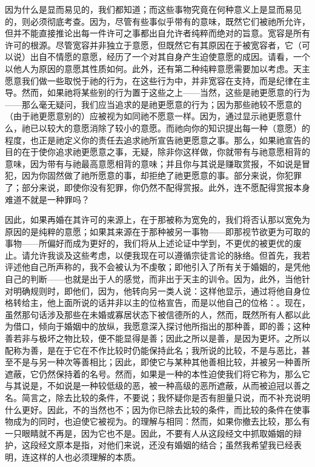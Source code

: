 因为什么是显而易见的，我们都知道；而这些事物究竟在何种意义上是显而易见的，则必须彻底考查。因为，尽管有些事似乎带有的意味，既然它们被祂所允许，但并不能直接推论出每一件许可之事都出自允许者纯粹而绝对的旨意。宽容是所有许可的根源。尽管宽容并非独立于意愿，但既然它有其原因在于被宽容者，它（可以说）出自不情愿的意愿，经历了一个对其自身产生迫使意愿的成因。请看，一个以他人为原因的意愿其性质如何。此外，还有第二种纯粹意愿需要加以考虑。天主愿意我们做一些取悦于祂的行为，在这些行为中，并非宽容在支持，而是纪律在主导。然而，如果祂将某些别的行为置于这些之上——当然，这些是祂更愿意的行为——那么毫无疑问，我们应当追求的是祂更愿意的行为；因为那些祂较不愿意的（由于祂更愿意别的）应被视为如同祂不愿意一样。因为，通过显示祂更愿意什么，祂已以较大的意愿消除了较小的意愿。而祂向你的知识提出每一种（意愿）的程度，也正是祂定义你的责任去追求祂所宣告祂更愿意之事。那么，如果祂宣告的目的在于使你追求祂更愿意之事，无疑，除非你这样做，你就带有与祂意愿相背的意味，因为带有与祂最高意愿相背的意味；并且你与其说是赚取赏报，不如说是冒犯，因为你固然做了祂所愿意的事，却拒绝了祂更愿意的事。部分来说，你犯罪了；部分来说，即使你没有犯罪，你仍然不配得赏报。此外，连不愿配得赏报本身难道不就是一种罪吗？\par

因此，如果再婚在其许可的来源上，在于那被称为宽免的，我们将否认那以宽免为原因的是纯粹的意愿；如果其来源在于那种被另一事物——即那视节欲更为可取的事物——所偏好而成为更好的，我们将从上述论证中学到，不更优的被更优的废止。请允许我谈及这些考虑，以便我现在可以遵循宗徒言论的脉络。但首先，我若评述他自己所声称的，我不会被认为不虔敬；即他引入了所有关于婚姻的，是凭他自己的判断——也就是出于人的感觉，而非出于天主的训令。因为，此外，当他针对明确规则时，即他们，因为，他转向另一类人说：这样他显示，通过将他自身位格转给主，他上面所说的话并非以主的位格宣告，而是以他自己的位格：。现在，虽然那句话涉及那些在未婚或寡居状态下被信德所的人，然而，既然所有人都以此为借口，倾向于婚姻中的放纵，我愿意深入探讨他所指出的那种善，即的善；这种善若非与极坏之物比较，便不能显得是善；因此之所以是善，是因为更坏。之所以配称为善，是在于它在不作比较时仍能保持此名；我所说的比较，不是与恶比，甚至不是与另一种次等善相比；因此，即使它与某种其他善相比较，并被另一种善所遮蔽，它仍然保持着的名号。然而，如果是一种的本性迫使我们将它称为，那么它与其说是，不如说是一种较低级的恶，被一种高级的恶所遮蔽，从而被迫冠以善之名。简言之，除去比较的条件，不要说；我怀疑你是否有胆量只说，而不补充说明什么更好。因此，不的当然也不；因为你已除去比较的条件，而比较的条件在使事物成为的同时，也迫使它被视为。的理解与相同：然而，如果你撤去比较，那么有一只眼睛就不再是，因为它也不是。因此，不要有人从这段经文中抓取婚姻的辩护，这段经文原本是指，对他们来说，还没有婚姻的结合；虽然我希望我已经表明，连这样的人也必须理解的本质。\par

